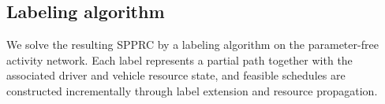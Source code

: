\documentclass[3p,11pt,authoryear]{elsarticle}  %
\begin{document}

\subsection{Labeling algorithm}

We solve the resulting SPPRC by a labeling algorithm on the parameter-free activity network. Each label represents a partial path together with the associated driver and vehicle resource state, and feasible schedules are constructed incrementally through label extension and resource propagation.
\end{document}
